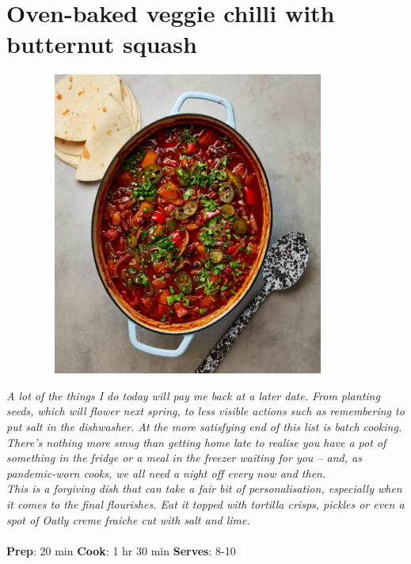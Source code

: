 \documentclass{book}
\begin{document}
\section{Oven-baked veggie chilli with butternut squash}
\begin{figure}
\centering\includegraphics[width=10cm,height=10cm,keepaspectratio]{Recipe_Pictures/Oven-baked_veggie_chilli_with_butternut_squash.png}
\end{figure}
\emph{A lot of the things I do today will pay me back at a later date. From planting seeds, which will flower next spring, to less visible actions such as remembering to put salt in the dishwasher. At the more satisfying end of this list is batch cooking. There’s nothing more smug than getting home late to realise you have a pot of something in the fridge or a meal in the freezer waiting for you – and, as pandemic-worn cooks, we all need a night off every now and then.\\ 
This is a forgiving dish that can take a fair bit of personalisation, especially when it comes to the final flourishes. Eat it topped with tortilla crisps, pickles or even a spot of Oatly creme fraiche cut with salt and lime.}\\\\ 
\textbf{Prep}: 20 min
\textbf{Cook}: 1 hr 30 min
\textbf{Serves}: 8-10
\end{document}
